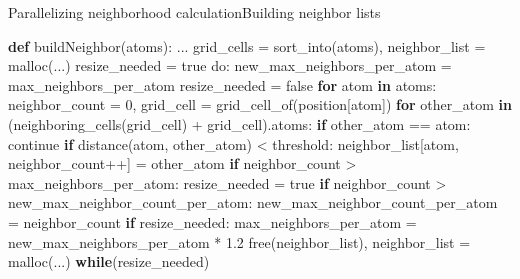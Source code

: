 \documentclass[ignorenonframetext,aspectratio=169]{beamer}
\newenvironment{Shaded}{}{}
\newcommand{\ConstantTok}[1]{\textcolor[rgb]{0.53,0.00,0.00}{#1}}
\newcommand{\ControlFlowTok}[1]{\textcolor[rgb]{0.00,0.44,0.13}{\textbf{#1}}}
\newcommand{\DecValTok}[1]{\textcolor[rgb]{0.25,0.63,0.44}{#1}}
\newcommand{\FloatTok}[1]{\textcolor[rgb]{0.25,0.63,0.44}{#1}}
\newcommand{\KeywordTok}[1]{\textcolor[rgb]{0.00,0.44,0.13}{\textbf{#1}}}
\newcommand{\NormalTok}[1]{#1}
\newcommand{\OperatorTok}[1]{\textcolor[rgb]{0.40,0.40,0.40}{#1}}
\begin{document}
\begin{frame}[fragile]{Parallelizing neighborhood calculation}{Building neighbor lists}
    \begin{scriptsize}
        \begin{Shaded}
            \begin{Highlighting}[]
\KeywordTok{def}\NormalTok{ buildNeighbor(atoms):}
\NormalTok{  ...}
\NormalTok{  grid_cells }\OperatorTok{=}\NormalTok{ sort_into(atoms), } \NormalTok{  neighbor_list }\OperatorTok{=}\NormalTok{ malloc(...)}
\NormalTok{  resize_needed }\OperatorTok{=}\NormalTok{ true}
  \ConstantTok{do:}
\NormalTok{    new_max_neighbors_per_atom }\OperatorTok{=}\NormalTok{ max_neighbors_per_atom}
\NormalTok{    resize_needed }\OperatorTok{=}\NormalTok{ false}
    \ControlFlowTok{for}\NormalTok{ atom }\KeywordTok{in}\NormalTok{ atoms:}
\NormalTok{      neighbor_count }\OperatorTok{=} \DecValTok{0}\NormalTok{,    grid_cell }\OperatorTok{=}\NormalTok{ grid_cell_of(position[atom])}
      \ControlFlowTok{for}\NormalTok{ other_atom }\KeywordTok{in}\NormalTok{ (neighboring_cells(grid_cell) + grid_cell).atoms:}
        \ControlFlowTok{if}\NormalTok{ other_atom == atom: continue}
        \ControlFlowTok{if}\NormalTok{ distance(atom, other_atom) }\OperatorTok{<}\NormalTok{ threshold:}
\NormalTok{          neighbor_list[atom,}\NormalTok{ neighbor_count++] }\OperatorTok{=}\NormalTok{ other_atom}
      \ControlFlowTok{if}\NormalTok{ neighbor_count }\OperatorTok{>}\NormalTok{ max_neighbors_per_atom:}
\NormalTok{        resize_needed }\OperatorTok{=}\NormalTok{ true}
        \ControlFlowTok{if}\NormalTok{ neighbor_count }\OperatorTok{>}\NormalTok{ new_max_neighbor_count_per_atom:}
\NormalTok{          new_max_neighbor_count_per_atom }\OperatorTok{=}\NormalTok{ neighbor_count}
    \ControlFlowTok{if}\NormalTok{ resize_needed:}
\NormalTok{      max_neighbors_per_atom }\OperatorTok{=}\NormalTok{ new_max_neighbors_per_atom }\OperatorTok{*} \FloatTok{1.2}
\NormalTok{      free(neighbor_list),}\NormalTok{      neighbor_list }\OperatorTok{=}\NormalTok{ malloc(...)}
  \ControlFlowTok{while}\NormalTok{(resize_needed)}
            \end{Highlighting}
        \end{Shaded}
    \end{scriptsize}
\end{frame}
\end{document}
